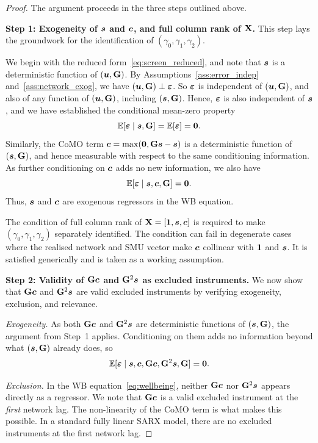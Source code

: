 \begin{proof}
The argument proceeds in the three steps outlined above.

\textbf{Step 1: Exogeneity of $\bm{s}$ and $\bm{c}$, and full column rank of $\mathbf{X}$.}
This step lays the groundwork for the identification of $(\gamma_0, \gamma_1, \gamma_2)$. 

We begin with the reduced form~\eqref{eq:screen_reduced}, and note that $\bm{s}$ is a deterministic function of $(\bm{u}, \mathbf{G})$. By Assumptions~\ref{ass:error_indep} and~\ref{ass:network_exog}, we have $(\bm{u}, \mathbf{G}) \perp \bm{\varepsilon}$. So $\bm{\varepsilon}$ is independent of $(\bm{u}, \mathbf{G})$, and also of any function of $(\bm{u}, \mathbf{G})$, including $(\bm{s}, \mathbf{G})$. Hence, $\bm{\varepsilon}$ is also independent of $\bm{s}$, and we have established the conditional mean-zero property
\[
    \mathbb{E}[\bm{\varepsilon} \mid \bm{s}, \mathbf{G}]
    = \mathbb{E}[\bm{\varepsilon}] = \bm{0}.
\]
Similarly, the CoMO term $\bm{c} = \max(\bm{0}, \mathbf{G}\bm{s} - \bm{s})$ is a deterministic function of $(\bm{s}, \mathbf{G})$, and hence measurable with respect to the same conditioning information. As further conditioning on $\bm{c}$ adds no new information, we also have
\[
    \mathbb{E}[\bm{\varepsilon} \mid \bm{s}, \bm{c}, \mathbf{G}]
    = \bm{0}.
\]
Thus, $\bm{s}$ and $\bm{c}$ are exogenous regressors in the WB equation.

The condition of full column rank of $\mathbf{X} = [\bm{1}, \bm{s}, \bm{c}]$ is required to make $(\gamma_0, \gamma_1, \gamma_2)$ separately identified. The condition can fail in degenerate cases where the realised network and SMU vector make $\bm{c}$ collinear with $\bm{1}$ and $\bm{s}$. It is satisfied generically and is taken as a working assumption.

\textbf{Step 2: Validity of $\mathbf{G}\bm{c}$ and $\mathbf{G}^2\bm{s}$ as excluded instruments.}
We now show that $\mathbf{G}\bm{c}$ and $\mathbf{G}^2\bm{s}$ are valid excluded instruments by verifying exogeneity, exclusion, and relevance.

\emph{Exogeneity.} As both $\mathbf{G}\bm{c}$ and $\mathbf{G}^2\bm{s}$ are deterministic functions of $(\bm{s}, \mathbf{G})$, the argument from Step~1 applies. Conditioning on them adds no information beyond what $(\bm{s}, \mathbf{G})$ already does, so
\[
    \mathbb{E}[\bm{\varepsilon} \mid \bm{s}, \bm{c}, \mathbf{G}\bm{c}, \mathbf{G}^2\bm{s}, \mathbf{G}]
    = \bm{0}.
\]

\emph{Exclusion.} In the WB equation~\eqref{eq:wellbeing}, neither $\mathbf{G}\bm{c}$ nor $\mathbf{G}^2\bm{s}$ appears directly as a regressor. We note that $\mathbf{G}\bm{c}$ is a valid excluded instrument at the \emph{first} network lag. The non-linearity of the CoMO term is what makes this possible. In a standard fully linear SARX model, there are no excluded instruments at the first network lag.


\end{proof}
